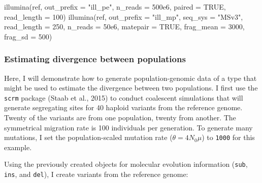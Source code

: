 \documentclass[12pt,]{article}
\newenvironment{Shaded}{}{}
\newcommand{\DataTypeTok}[1]{#1}
\newcommand{\DecValTok}[1]{#1}
\newcommand{\FloatTok}[1]{#1}
\newcommand{\KeywordTok}[1]{\textcolor[rgb]{0.00,0.00,1.00}{#1}}
\newcommand{\NormalTok}[1]{#1}
\newcommand{\OperatorTok}[1]{#1}
\newcommand{\OtherTok}[1]{\textcolor[rgb]{1.00,0.25,0.00}{#1}}
\newcommand{\StringTok}[1]{\textcolor[rgb]{0.00,0.50,0.50}{#1}}
\begin{document}
\begin{Shaded}
\begin{Highlighting}[]
\KeywordTok{illumina}\NormalTok{(ref, }\DataTypeTok{out_prefix =} \StringTok{"ill_pe"}\NormalTok{, }\DataTypeTok{n_reads =} \FloatTok{500e6}\NormalTok{, }\DataTypeTok{paired =} \OtherTok{TRUE}\NormalTok{,}
         \DataTypeTok{read_length =} \DecValTok{100}\NormalTok{)}
\KeywordTok{illumina}\NormalTok{(ref, }\DataTypeTok{out_prefix =} \StringTok{"ill_mp"}\NormalTok{, }\DataTypeTok{seq_sys =} \StringTok{"MSv3"}\NormalTok{,}
         \DataTypeTok{read_length =} \DecValTok{250}\NormalTok{, }\DataTypeTok{n_reads =} \FloatTok{50e6}\NormalTok{, }\DataTypeTok{matepair =} \OtherTok{TRUE}\NormalTok{, }
         \DataTypeTok{frag_mean =} \DecValTok{3000}\NormalTok{, }\DataTypeTok{frag_sd =} \DecValTok{500}\NormalTok{)}
\end{Highlighting}
\end{Shaded}

\hypertarget{estimating-divergence-between-populations}{%
\subsubsection{Estimating divergence between populations}\label{estimating-divergence-between-populations}}

Here, I will demonstrate how to generate population-genomic data of a type that might
be used to estimate the divergence between two populations.
I first use the \texttt{scrm} package (Staab et al., 2015)
to conduct
coalescent simulations that will generate segregating sites for 40 haploid variants
from the reference genome.
Twenty of the variants are from one population, twenty from another.
The symmetrical migration rate is 100 individuals per generation.
To generate many mutations, I set the population-scaled mutation rate
(\(\theta = 4 N_0 \mu\)) to \texttt{1000} for this example.

\begin{Shaded}
\end{Shaded}

Using the previously created objects for molecular evolution information (\texttt{sub},
\texttt{ins}, and \texttt{del}), I create variants from the reference genome:
\end{document}
